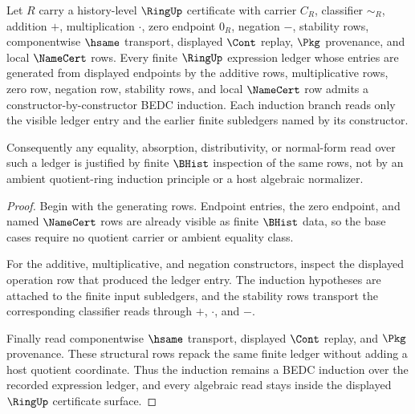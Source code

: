 \begin{theorem}
\label{thm:ring-finite-expression-ledger-induction}
Let $R$ carry a history-level $\RingUp$ certificate with carrier $C_R$, classifier $\sim_R$, addition $+$, multiplication $\cdot$, zero endpoint $0_R$, negation $-$, stability rows, componentwise $\hsame$ transport, displayed $\Cont$ replay, $\Pkg$ provenance, and local $\NameCert$ rows. Every finite $\RingUp$ expression ledger whose entries are generated from displayed endpoints by the additive rows, multiplicative rows, zero row, negation row, stability rows, and local $\NameCert$ row admits a constructor-by-constructor BEDC induction. Each induction branch reads only the visible ledger entry and the earlier finite subledgers named by its constructor.

Consequently any equality, absorption, distributivity, or normal-form read over such a ledger is justified by finite $\BHist$ inspection of the same rows, not by an ambient quotient-ring induction principle or a host algebraic normalizer.
\end{theorem}
\begin{proof}
Begin with the generating rows. Endpoint entries, the zero endpoint, and named $\NameCert$ rows are already visible as finite $\BHist$ data, so the base cases require no quotient carrier or ambient equality class.

For the additive, multiplicative, and negation constructors, inspect the displayed operation row that produced the ledger entry. The induction hypotheses are attached to the finite input subledgers, and the stability rows transport the corresponding classifier reads through $+$, $\cdot$, and $-$.

Finally read componentwise $\hsame$ transport, displayed $\Cont$ replay, and $\Pkg$ provenance. These structural rows repack the same finite ledger without adding a host quotient coordinate. Thus the induction remains a BEDC induction over the recorded expression ledger, and every algebraic read stays inside the displayed $\RingUp$ certificate surface.
\end{proof}

